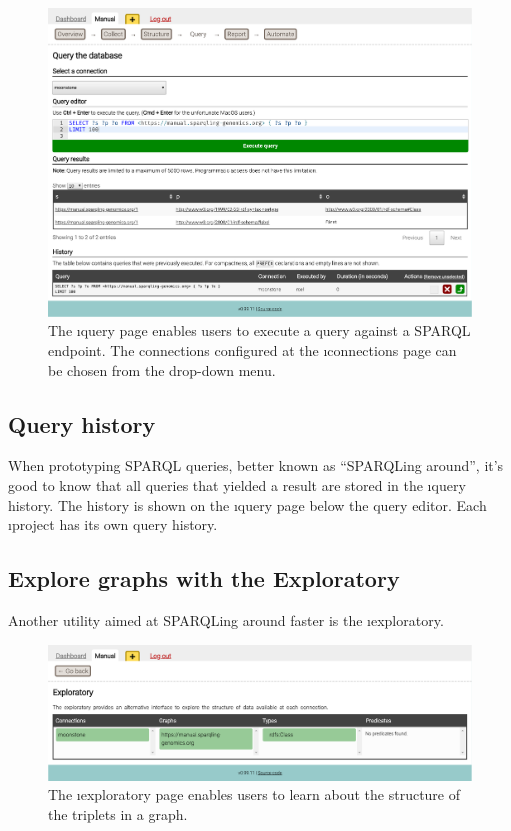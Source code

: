  \begin{figure}[H]
    \begin{center}
      \includegraphics[width=1.0\textwidth]{figures/sg-web-query.pdf}
    \end{center}
    \caption{The \i{query} page enables users to execute a query against a
      SPARQL endpoint.  The connections configured at the \i{connections} page
      can be chosen from the drop-down menu.}
    \label{fig:web-query}
  \end{figure}

\subsection{Query history}
\label{sec:query-history}

  When prototyping SPARQL queries, better known as ``SPARQLing around'', it's
  good to know that all queries that yielded a result are stored in the
  \i{query history}.  The history is shown on the \i{query} page below the
  query editor.  Each \i{project} has its own query history.

\subsection{Explore graphs with the Exploratory}

  Another utility aimed at SPARQLing around faster is the \i{exploratory}.

  \begin{figure}[H]
    \begin{center}
      \includegraphics[width=1.0\textwidth]{figures/sg-web-exploratory.pdf}
    \end{center}
    \caption{The \i{exploratory} page enables users to learn about the
      structure of the triplets in a graph.}
    \label{fig:web-exploratory}
  \end{figure}

